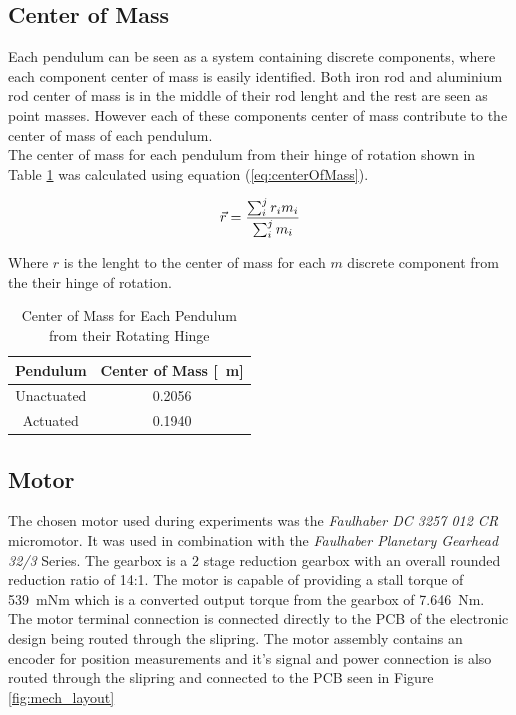 \subsection{Center of Mass}
Each pendulum can be seen as a system containing discrete components, where each component center of mass is easily identified. Both iron rod and aluminium rod center of mass is in the middle of their rod lenght and the rest are seen as point masses. However each of these components center of mass contribute to the center of mass of each pendulum.\\

The center of mass for each pendulum from their hinge of rotation shown in Table \ref{table:centerOfMass} was calculated using equation (\ref{eq:centerOfMass}). 

\begin{equation} \label{eq:centerOfMass}
\vec{\boldmath{r}} = \frac{\sum_{i}^{j}r_{i}m_{i}}{\sum_{i}^{j}m_{i}}
\end{equation}

Where $r$ is the lenght to the center of mass for each $m$ discrete component from the their hinge of rotation.

\begin{table}[]
	\centering
	\begin{tabular}{|c|c|}
		\hline
		Pendulum & Center of Mass [\SI{}{m}] \\
		\hline
		\hline
		Unactuated  & \SI{0.2056}{} \\
		\hline
		Actuated  & \SI{0.1940}{} \\
		\hline
	\end{tabular}
	\caption{Center of Mass for Each Pendulum from their Rotating Hinge}
	\label{table:centerOfMass}
\end{table}


\subsection{Motor}
The chosen motor used during experiments was the \textit{Faulhaber DC 3257 012 CR} micromotor. It was used in combination with the \textit{Faulhaber Planetary Gearhead 32/3} Series. The gearbox is a 2 stage reduction gearbox with an overall rounded reduction ratio of 14:1. The motor is capable of providing a stall torque of \SI{539}{mNm} which is a converted output torque from the gearbox of \SI{7.646}{Nm}.\\

The motor terminal connection is connected directly to the PCB of the electronic design being routed through the slipring. The motor assembly contains an encoder for position measurements and it's signal and power connection is also routed through the slipring and connected to the PCB seen in Figure \ref{fig:mech_layout}\\

